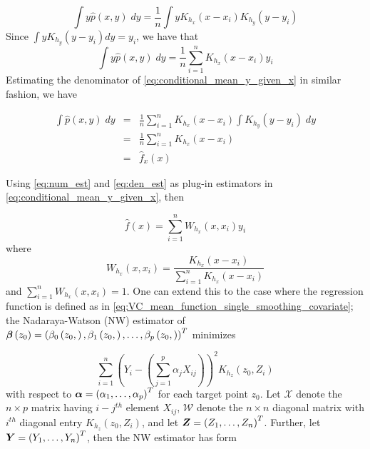 \documentclass[12pt]{article}
\newcommand{\bfbeta}{\mbox{\boldmath $\beta$}}
\newcommand{\bfalpha}{\mbox{\boldmath $\alpha$}}
\newcommand{\bfY}{\mbox{\boldmath $Y$}}
\newcommand{\bfZ}{\mbox{\boldmath $Z$}}
\begin{document}
\begin{equation} \nonumber 
\int y \hat{p}\left(x,y\right)\;dy = \frac{1}{n} \int y K_{h_x}\left(x-x_i\right) K_{h_y}\left(y-y_i\right)
\end{equation} 
\noindent
Since $\int yK_{h_y}\left(y-y_i\right)dy = y_i$, we have that 
\begin{equation} \label{eq:num_est}
\int y \hat{p}\left(x,y\right)\;dy = \frac{1}{n}\sum_{i=1}^n K_{h_x}\left(x-x_i\right) y_i 
\end{equation} 
\noindent
Estimating the denominator of \ref{eq:conditional_mean_y_given_x} in similar fashion, we have 

\begin{eqnarray}
\int \hat{p}\left(x,y\right)\;dy &=& \frac{1}{n}\sum_{i=1}^{n} K_{h_x}\left(x-x_i\right) \int K_{h_y}\left(y-y_i\right)\;dy \nonumber \\
&=& \frac{1}{n}\sum_{i=1}^{n} K_{h_x}\left(x-x_i\right) \nonumber \\
&=& \hat{f}_x\left(x\right) \label{eq:den_est} 
\end{eqnarray}

Using \ref{eq:num_est} and \ref{eq:den_est} as plug-in estimators in \ref{eq:conditional_mean_y_given_x}, then 

\begin{equation} 
\hat{f}\left(x\right) = \sum_{i=1}^n W_{h_x}\left(x,x_i\right)y_i
\end{equation}
\noindent
where 
\begin{equation} \nonumber
W_{h_x}\left(x,x_i\right) = \frac{K_{h_x}\left(x-x_i\right) }{\sum_{i=1}^{n} K_{h_x}\left(x-x_i\right)}
\end{equation}
\noindent
and $\sum_{i=1}^n W_{h_x}\left(x,x_i\right) = 1$. One can extend this to the case where the regression function is defined as in \ref{eq:VC_mean_function_single_smoothing_covariate}; the Nadaraya-Watson (NW) estimator of $\bfbeta\left(z_0\right) = \left(\beta_0\left(z_0,\right), \beta_1\left(z_0,\right),\dots,\beta_p\left(z_0,\right)\right)^T$ minimizes

\begin{equation} \nonumber 
\sum_{i=1}^n \left(Y_i - \left(\sum_{j=1}^p \alpha_j X_{ij}\right)\right)^2 K_{h_z}\left(z_0,Z_i\right)
\end{equation} 
\noindent
with respect to $\bfalpha = \left( \alpha_1, \dots, \alpha_p\right)^T$ for each target point $z_0$. Let $\mathcal{X}$ denote the $n \times p$ matrix having $i-j^{th}$ element $X_{ij}$, $\mathcal{W}$ denote the $n \times n$ diagonal matrix with $i^{th}$ diagonal entry $K_{h_z}\left(z_0, Z_i\right)$, and let $\bfZ = \left(Z_1, \dots, Z_n\right)^T$. Further, let $\bfY = \left(Y_1, \dots, Y_n\right)^T$, then the NW estimator has form
\end{document}
